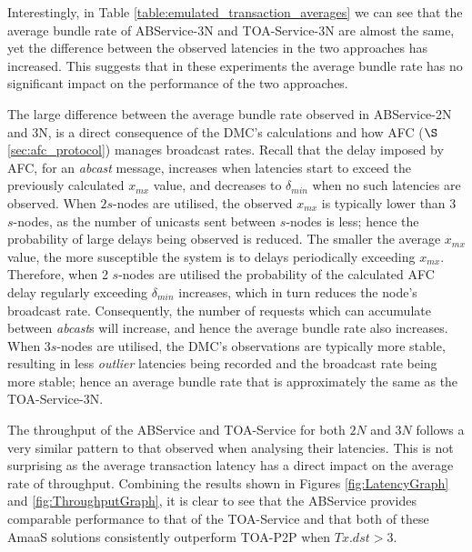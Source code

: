     Interestingly, in Table \ref{table:emulated_transaction_averages} we can see that the average bundle rate of ABService-3N and TOA-Service-3N are almost the same, yet the difference between the observed latencies in the two approaches has increased.  This suggests that in these experiments the average bundle rate has no significant impact on the performance of the two approaches.  
    
    The large difference between the average bundle rate observed in ABService-2N and 3N, is a direct consequence of the DMC's calculations and how AFC ($\S$ \ref{sec:afc_protocol}) manages broadcast rates.  Recall that the delay imposed by AFC, for an \emph{abcast} message, increases when latencies start to exceed the previously calculated $x_{mx}$ value, and decreases to $\delta_{min}$ when no such latencies are observed.  When $2 s$-nodes are utilised, the observed $x_{mx}$ is typically lower than 3 $s$-nodes, as the number of unicasts sent between $s$-nodes is less; hence the probability of large delays being observed is reduced.  The smaller the average $x_{mx}$ value, the more susceptible the system is to delays periodically exceeding $x_{mx}$.  Therefore, when 2 $s$-nodes are utilised the probability of the calculated AFC delay regularly exceeding $\delta_{min}$ increases, which in turn reduces the node's broadcast rate.  Consequently, the number of requests which can accumulate between \emph{abcast}s will increase, and hence the average bundle rate also increases.  When $3 s$-nodes are utilised, the DMC's observations are typically more stable, resulting in less \emph{outlier} latencies being recorded and the broadcast rate being more stable; hence an average bundle rate that is approximately the same as the TOA-Service-3N.  
	
	The throughput of the ABService and TOA-Service for both $2N$ and $3N$ follows a very similar pattern to that observed when analysing their latencies.  This is not surprising as the average transaction latency has a direct impact on the average rate of throughput.  Combining the results shown in Figures \ref{fig:LatencyGraph} and \ref{fig:ThroughputGraph}, it is clear to see that the ABService provides comparable performance to that of the TOA-Service and that both of these \textsf{AmaaS} solutions consistently outperform TOA-P2P when $Tx.dst > 3$.  
	
